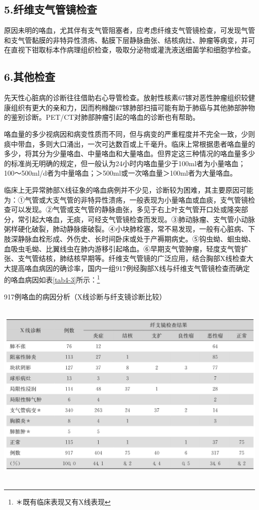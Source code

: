 \subsection{5.纤维支气管镜检查}

原因未明的咯血，尤其伴有支气管阻塞者，应考虑纤维支气管镜检查，可发现气管和支气管黏膜的非特异性溃疡、黏膜下层静脉曲张、结核病灶、肿瘤等病变，并可在直视下钳取标本作病理组织检查，吸取分泌物或灌洗液送细菌学和细胞学检查。

\subsection{6.其他检查}

先天性心脏病的诊断往往借助右心导管检查。放射性核素67镓对恶性肿瘤组织较健康组织有更大的亲和力，因而枸橼酸67镓肺部扫描可能有助于肺癌与其他肺部肿物的鉴别诊断。PET/CT对肺部肿瘤引起的咯血的诊断也有帮助。

咯血量的多少视病因和病变性质而不同，但与病变的严重程度并不完全一致，少则痰中带血，多则大口涌出，一次可达数百或上千毫升。临床上常根据患者咯血量的多少，将其分为少量咯血、中量咯血和大量咯血。但界定这三种情况的咯血量多少的标准尚无明确的规定，但一般认为24小时内咯血量少于100ml者为小量咯血；100～500ml/d者为中量咯血；＞500ml或一次咯血量＞100ml者为大量咯血。

临床上无异常肺部X线征象的咯血病例并不少见，诊断较为困难，其主要原因可能为：①气管或大支气管的非特异性溃疡，一般表现为小量咯血或血痰，支气管镜检查可以发现。②气管或支气管的静脉曲张，多见于右上叶支气管开口处或隆突部分，常引起大咯血，无痰，可经支气管镜检查而发现。③肺动脉瘤、支气管小动脉粥样硬化破裂，肺动静脉瘘破裂。④小块肺栓塞，常不易发现，一般有心脏病、下肢深静脉血栓形成、外伤史、长时间卧床或处于产褥期病史。⑤钩虫蚴、蛔虫蚴、血吸虫毛蚴、比翼线虫在肺内游移引起咯血。⑥早期支气管肿瘤，轻度支气管扩张、支气管结核，肺结核早期等。纤维支气管镜的广泛应用，结合胸部X线检查大大提高咯血病因的确诊率，国内一组917例经胸部X线与纤维支气管镜检查而确定的咯血病因如表\ref{tab4-3}所示：\footnote{＊既有临床表现又有X线表现}

\begin{table}[htbp]
\centering
\caption{917例咯血的病因分析（X线诊断与纤支镜诊断比较）}
\label{tab4-3}
\includegraphics[width=5.91667in,height=3.58333in]{./images/Image00040.jpg}
\end{table}

